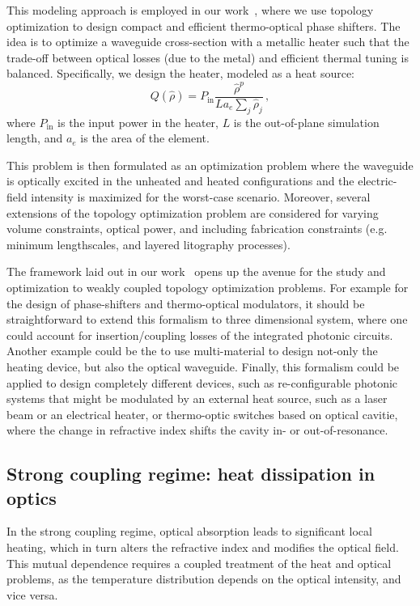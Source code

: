 This modeling approach is employed in our work~\cite{ownpub0}, where we use topology optimization to design compact and efficient thermo-optical phase shifters. 
The idea is to optimize a waveguide cross-section with a metallic heater such that the trade-off between optical losses (due to the metal) and efficient thermal tuning is balanced. 
Specifically, we design the heater, modeled as a heat source:
\begin{equation}
    Q(\hat{\rho})=P_{\text{in}} \frac{\hat{\rho}^p}{L a_e \sum_j \hat{\rho}_j}\,,
\end{equation}
where $P_\text{in}$ is the input power in the heater, $L$ is the out-of-plane simulation length, and $a_e$ is the area of the element.

This problem is then formulated as an optimization problem
where the waveguide is optically excited in the unheated and heated configurations and the electric-field intensity is maximized for the worst-case scenario. Moreover,
several extensions of the topology optimization problem are considered for varying volume constraints, optical power, and including fabrication constraints (e.g. minimum lengthscales, and layered 
litography processes).

The framework laid out in our work~\cite{ownpub0} opens up the avenue for the study and optimization to weakly coupled topology optimization problems. For example for the design of phase-shifters and thermo-optical modulators, it should be straightforward to extend this
formalism to three dimensional system, where one could account for insertion/coupling losses of the integrated photonic circuits. Another example could be the to use multi-material to design not-only the heating
device, but also the optical waveguide. Finally, this formalism could be applied to design completely different devices, such as re-configurable photonic systems that might be modulated by an external heat source, such as a laser beam or an electrical heater, or thermo-optic 
switches based on optical cavitie, where the change in refractive index shifts the cavity in- or out-of-resonance.

\subsection*{Strong coupling regime: heat dissipation in optics}

In the strong coupling regime, optical absorption leads to significant local heating, which in turn alters the refractive index and modifies the optical field. This mutual dependence requires a coupled treatment of the heat and optical problems, as the temperature distribution depends on the optical intensity, and vice versa.

